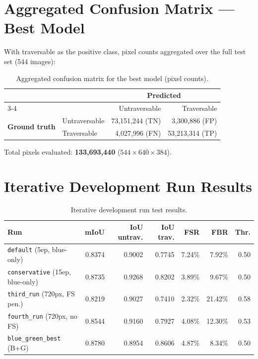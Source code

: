 \documentclass[12pt,a4paper]{report}
\begin{document}
\section{Aggregated Confusion Matrix --- Best Model}

With traversable as the positive class, pixel counts aggregated over the full test set (544 images):

\begin{table}[H]
\centering
\caption{Aggregated confusion matrix for the best model (pixel counts).}
\label{tab:confusion_best}
\begin{tabular}{@{}llrr@{}}
\toprule
 & & \multicolumn{2}{c}{\textbf{Predicted}} \\
\cmidrule(lr){3-4}
 & & Untraversable & Traversable \\
\midrule
\multirow{2}{*}{\textbf{Ground truth}} & Untraversable & 73{,}151{,}244 (TN) & 3{,}300{,}886 (FP) \\
 & Traversable & 4{,}027{,}996 (FN) & 53{,}213{,}314 (TP) \\
\bottomrule
\end{tabular}
\end{table}

Total pixels evaluated: \textbf{133{,}693{,}440} ($544 \times 640 \times 384$).

\section{Iterative Development Run Results}

\begin{table}[H]
\centering
\caption{Iterative development run test results.}
\label{tab:iterative_results}
\small
\begin{tabular}{@{}lrrrrr r@{}}
\toprule
\textbf{Run} & \textbf{mIoU} & \textbf{IoU untrav.} & \textbf{IoU trav.} & \textbf{FSR} & \textbf{FBR} & \textbf{Thr.} \\
\midrule
\texttt{default} (5ep, blue-only)           & 0.8374 & 0.9002 & 0.7745 & 7.24\% & 7.92\%  & 0.50 \\
\texttt{conservative} (15ep, blue-only)     & 0.8735 & 0.9268 & 0.8202 & 3.89\% & 9.67\%  & 0.50 \\
\texttt{third\_run} (720px, FS pen.)        & 0.8219 & 0.9027 & 0.7410 & 2.32\% & 21.42\% & 0.58 \\
\texttt{fourth\_run} (720px, no FS)         & 0.8544 & 0.9160 & 0.7927 & 4.08\% & 12.30\% & 0.53 \\
\texttt{blue\_green\_best} (B+G)            & 0.8780 & 0.8954 & 0.8606 & 4.87\% & 8.34\%  & 0.50 \\
\bottomrule
\end{tabular}
\end{table}
\end{document}
